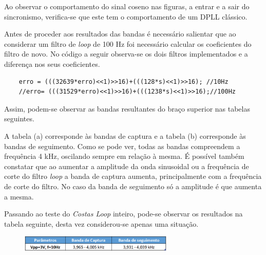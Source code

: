 \documentclass[11pt]{article}
\numberwithin{equation}{section}
\begin{document}
Ao observar o comportamento do sinal coseno nas figuras, a entrar e a sair do sincronismo, verifica-se que este tem o comportamento de um DPLL clássico.

Antes de proceder aos resultados das bandas é necessário salientar que ao considerar um filtro de \textit{loop} de 100 Hz foi necessário calcular os coeficientes do filtro de novo. No código a seguir observa-se os dois filtros implementados e a diferença nos seus coeficientes. 
\begin{lstlisting}
	erro = (((32639*erro)<<1)>>16)+(((128*s)<<1)>>16); //10Hz
	//erro= (((31529*erro)<<1)>>16)+(((1238*s)<<1)>>16);//100Hz
\end{lstlisting}

Assim, podem-se observar as bandas resultantes do braço superior nas tabelas seguintes.
\begin{figure}[H]
	\centering
	\hspace{6 mm}
\end{figure}

A tabela (a) corresponde às bandas de captura e a tabela (b) corresponde às bandas de seguimento. Como se pode ver, todas as bandas compreendem a frequência 4 kHz, oscilando sempre em relação à mesma.
É possível também constatar que ao aumentar a amplitude da onda sinusoidal ou a frequência de corte do filtro \textit{loop} a banda de captura aumenta, principalmente com a frequência de corte do filtro. No caso da banda de seguimento só a amplitude é que aumenta a mesma.

Passando ao teste do \textit{Costas Loop} inteiro, pode-se observar os resultados na tabela seguinte, desta vez considerou-se apenas uma situação. 
\begin{figure}[H]
	\centering
	\includegraphics[width=0.65\textwidth]{./tab_costa}~\\
\end{figure}
\end{document}
